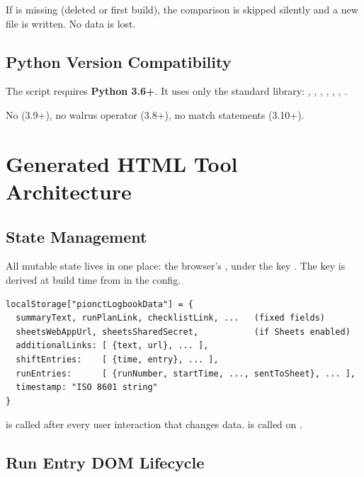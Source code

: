 \begin{notebox}
If  is missing (deleted or first build), the comparison
is skipped silently and a new file is written. No data is lost.
\end{notebox}

\section{Python Version Compatibility}

The script requires \textbf{Python 3.6+}. It uses only the standard library:
, , , , ,
, .

No  (3.9+), no walrus operator (3.8+), no match
statements (3.10+).

\chapter{Generated HTML Tool Architecture}

\section{State Management}

All mutable state lives in one place: the browser's ,
under the key . The key is
derived at build time from  in the config.

\begin{lstlisting}
localStorage["pionctLogbookData"] = {
  summaryText, runPlanLink, checklistLink, ...   (fixed fields)
  sheetsWebAppUrl, sheetsSharedSecret,           (if Sheets enabled)
  additionalLinks: [ {text, url}, ... ],
  shiftEntries:    [ {time, entry}, ... ],
  runEntries:      [ {runNumber, startTime, ..., sentToSheet}, ... ],
  timestamp: "ISO 8601 string"
}
\end{lstlisting}

 is called after every user interaction that
changes data.  is called on
.

\section{Run Entry DOM Lifecycle}

